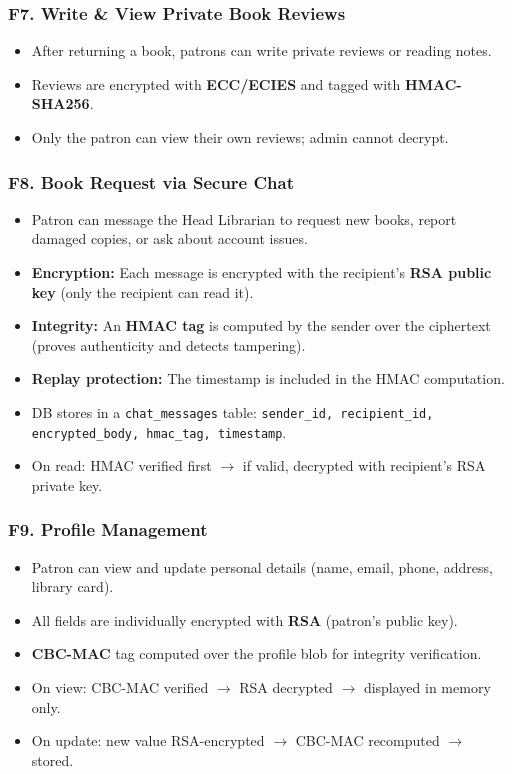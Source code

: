 \documentclass[12pt]{article}
\begin{document}
\subsubsection{F7. Write \& View Private Book Reviews}
\begin{itemize}
    \item After returning a book, patrons can write private reviews or reading notes.
    \item Reviews are encrypted with \textbf{ECC/ECIES} and tagged with \textbf{HMAC-SHA256}.
    \item Only the patron can view their own reviews; admin cannot decrypt.
\end{itemize}

\subsubsection{F8. Book Request via Secure Chat}
\begin{itemize}
    \item Patron can message the Head Librarian to request new books, report damaged copies, or ask about account issues.
    \item \textbf{Encryption:} Each message is encrypted with the recipient's \textbf{RSA public key} (only the recipient can read it).
    \item \textbf{Integrity:} An \textbf{HMAC tag} is computed by the sender over the ciphertext (proves authenticity and detects tampering).
    \item \textbf{Replay protection:} The timestamp is included in the HMAC computation.
    \item DB stores in a \texttt{chat\_messages} table: \texttt{sender\_id, recipient\_id, encrypted\_body, hmac\_tag, timestamp}.
    \item On read: HMAC verified first $\rightarrow$ if valid, decrypted with recipient's RSA private key.
\end{itemize}

\subsubsection{F9. Profile Management}
\begin{itemize}
    \item Patron can view and update personal details (name, email, phone, address, library card).
    \item All fields are individually encrypted with \textbf{RSA} (patron's public key).
    \item \textbf{CBC-MAC} tag computed over the profile blob for integrity verification.
    \item On view: CBC-MAC verified $\rightarrow$ RSA decrypted $\rightarrow$ displayed in memory only.
    \item On update: new value RSA-encrypted $\rightarrow$ CBC-MAC recomputed $\rightarrow$ stored.
\end{itemize}
\end{document}
